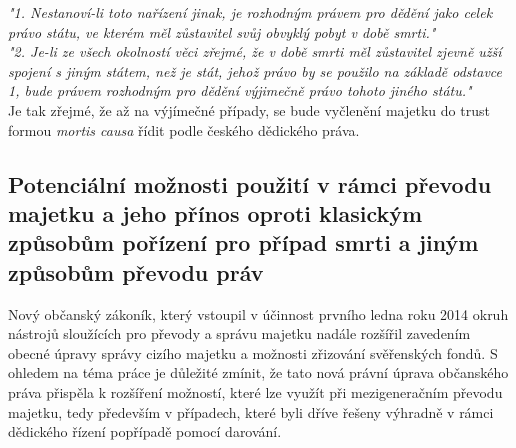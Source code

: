 \documentclass{article}
\begin{document}
\textit{"1. Nestanoví-li toto nařízení jinak, je rozhodným právem pro dědění jako celek právo státu, ve kterém měl zůstavitel svůj obvyklý pobyt v době smrti."}\\
 
\textit{"2. Je-li ze všech okolností věci zřejmé, že v době smrti měl
zůstavitel zjevně užší spojení s jiným státem, než je stát, jehož
právo by se použilo na základě odstavce 1, bude právem
rozhodným pro dědění výjimečně právo tohoto jiného státu."}\\

Je tak zřejmé, že až na výjímečné případy, se bude vyčlenění majetku do trust formou \textit{mortis causa} řídit podle českého dědického práva.\\

\newpage

\subsection{Potenciální možnosti použití v rámci převodu majetku a jeho přínos oproti klasickým způsobům pořízení pro případ smrti a jiným způsobům převodu práv}




Nový občanský zákoník, který vstoupil v účinnost prvního ledna roku 2014 okruh nástrojů sloužících pro převody a správu majetku nadále rozšířil zavedením obecné úpravy správy cizího majetku a možnosti zřizování svěřenských fondů. S ohledem na téma práce je důležité zmínit, že tato nová právní úprava občanského práva přispěla k rozšíření možností, které lze využít při mezigeneračním převodu majetku, tedy především v případech, které byli dříve řešeny výhradně v rámci dědického řízení popřípadě pomocí darování.\\
\end{document}
